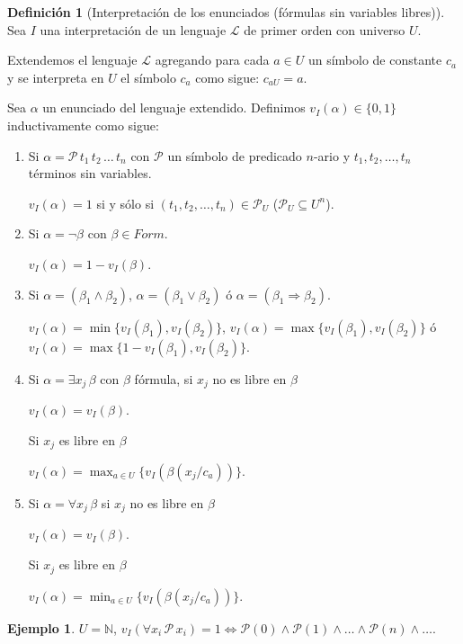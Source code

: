 \documentclass[a4paper,11pt]{article}
\theoremstyle{definition}
\newtheorem{defn}{Definición}[section]
\newtheorem{exap}{Ejemplo}[section]
\theoremstyle{remark}
\def\NN{\mathbb{N}}
\def\LL{\ensuremath{\mathcal{L}}}
\def\PP{\ensuremath{\mathcal{P}}}
\begin{document}
\begin{defn}[Interpretación de los enunciados (fórmulas sin variables libres)]
    Sea $I$ una interpretación de un lenguaje $\LL$ de primer orden con universo $U$. 
    
    Extendemos el lenguaje $\LL$ agregando para cada $a \in U$ un símbolo de 
    constante $c_a$ y se interpreta en $U$ el símbolo $c_a$ como sigue: $c_{aU} = a$.
    
    Sea $\alpha$ un enunciado del lenguaje extendido. Definimos $v_I(\alpha) \in \{0, 1\}$
    inductivamente como sigue:
    
    \begin{enumerate}
        \item Si $\alpha = \PP\,t_1\,t_2\,\dots\,t_n$ con $\PP$ un símbolo de predicado
        $n$-ario y $t_1, t_2, \dots, t_n$ términos sin variables.
        
        $v_I(\alpha) = 1$ si y sólo si $(t_1, t_2, \dots, t_n) \in \PP_U$ ($\PP_U \subseteq U^n$).
        
        \item Si $\alpha = \lnot\beta$ con $\beta \in Form$.
        
        $v_I(\alpha) = 1 - v_I(\beta)$.
        
        \item Si $\alpha = (\beta_1 \land \beta_2)$, $\alpha = (\beta_1 \lor \beta_2)$ ó 
        $\alpha = (\beta_1 \Rightarrow \beta_2)$.
        
        $v_I(\alpha) = \min\{v_I(\beta_1), v_I(\beta_2)\}$, $v_I(\alpha) = \max\{v_I(\beta_1), v_I(\beta_2)\}$
        ó $v_I(\alpha) = \max\{1 - v_I(\beta_1), v_I(\beta_2)\}$.
        
        \item Si $\alpha = \exists x_j\,\beta$ con $\beta$ fórmula, si $x_j$ no es libre en $\beta$
        
        $v_I(\alpha) = v_I(\beta)$.
        
        Si $x_j$ es libre en $\beta$
        
        $v_I(\alpha) = \max_{a \in U}\{v_I(\beta(x_j/c_a))\}$.
        
        \item Si $\alpha = \forall x_j\,\beta$ si $x_j$ no es libre en $\beta$
        
        $v_I(\alpha) = v_I(\beta)$.
        
        Si $x_j$ es libre en $\beta$
        
        $v_I(\alpha) = \min_{a \in U}\{v_I(\beta(x_j/c_a))\}$.
    \end{enumerate}
\end{defn}

\begin{exap}
    $U = \NN$, $v_I(\forall x_i\,\PP\,x_i) = 1 \iff \PP(0) \land \PP(1) \land \dots \land \PP(n) \land \dots$.
\end{exap}
\end{document}
